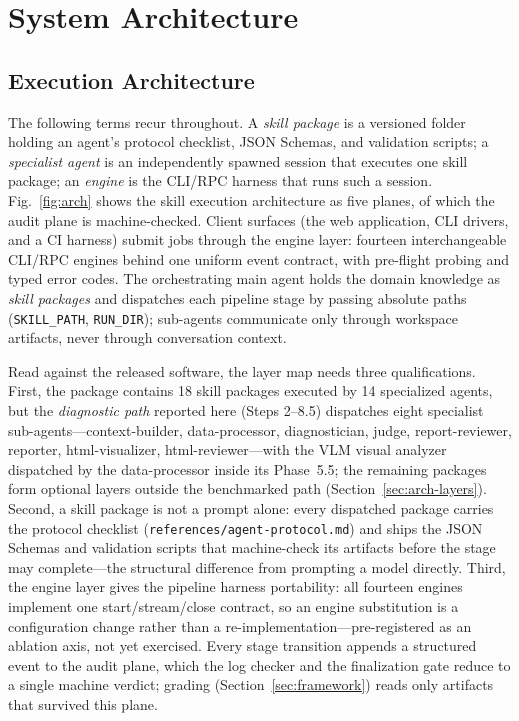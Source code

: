 \documentclass[preprint,10pt]{elsarticle}
\begin{document}
\section{System Architecture}
\label{sec:arch}

\subsection{Execution Architecture}
The following terms recur throughout. A \emph{skill package} is a versioned folder holding an agent's protocol checklist, JSON Schemas, and validation scripts; a \emph{specialist agent} is an independently spawned session that executes one skill package; an \emph{engine} is the CLI/RPC harness that runs such a session. Fig.~\ref{fig:arch} shows the skill execution architecture as five planes, of which the audit plane is machine-checked. Client surfaces (the web application, CLI drivers, and a CI harness) submit jobs through the engine layer: fourteen interchangeable CLI/RPC engines behind one uniform event contract, with pre-flight probing and typed error codes. The orchestrating main agent holds the domain knowledge as \emph{skill packages} and dispatches each pipeline stage by passing absolute paths (\texttt{SKILL\_PATH}, \texttt{RUN\_DIR}); sub-agents communicate only through workspace artifacts, never through conversation context.

Read against the released software, the layer map needs three qualifications. First, the package contains 18 skill packages executed by 14 specialized agents, but the \emph{diagnostic path} reported here (Steps 2--8.5) dispatches eight specialist sub-agents---context-builder, data-processor, diagnostician, judge, report-reviewer, reporter, html-visualizer, html-reviewer---with the VLM visual analyzer dispatched by the data-processor inside its Phase~5.5; the remaining packages form optional layers outside the benchmarked path (Section~\ref{sec:arch-layers}). Second, a skill package is not a prompt alone: every dispatched package carries the protocol checklist (\texttt{references/agent-protocol.md}) and ships the JSON Schemas and validation scripts that machine-check its artifacts before the stage may complete---the structural difference from prompting a model directly. Third, the engine layer gives the pipeline harness portability: all fourteen engines implement one start/stream/close contract, so an engine substitution is a configuration change rather than a re-implementation---pre-registered as an ablation axis, not yet exercised. Every stage transition appends a structured event to the audit plane, which the log checker and the finalization gate reduce to a single machine verdict; grading (Section~\ref{sec:framework}) reads only artifacts that survived this plane.
\end{document}
